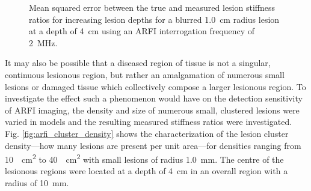 			\begin{figure}[!htb]
				\centering
				\caption[ARFI imaging-acquired lesion stiffness mean squared error related to lesion blurring]{Mean squared error between the true and measured lesion stiffness ratios for increasing lesion depths for a blurred \SI{1.0}{cm} radius lesion at a depth of \SI{4}{\cm} using an ARFI interrogation frequency of \SI{2}{\MHz}.}
				\label{fig:arfi_blur_mse}
			\end{figure}

			It may also be possible that a diseased region of tissue is not a singular, continuous lesionous region, but rather an amalgamation of numerous small lesions or damaged tissue which collectively compose a larger lesionous region. To investigate the effect such a phenomenon would have on the detection sensitivity of ARFI imaging, the density and size of numerous small, clustered lesions were varied in models and the resulting measured stiffness ratios were investigated. Fig. \ref{fig:arfi_cluster_density} shows the characterization of the lesion cluster density---how many lesions are present per unit area---for densities ranging from \SI{10}{\per\cm\squared} to \SI{40}{\per\cm\squared} with small lesions of radius \SI{1.0}{\mm}. The centre of the lesionous regions were located at a depth of \SI{4}{\cm} in an overall region with a radius of \SI{10}{\mm}.

